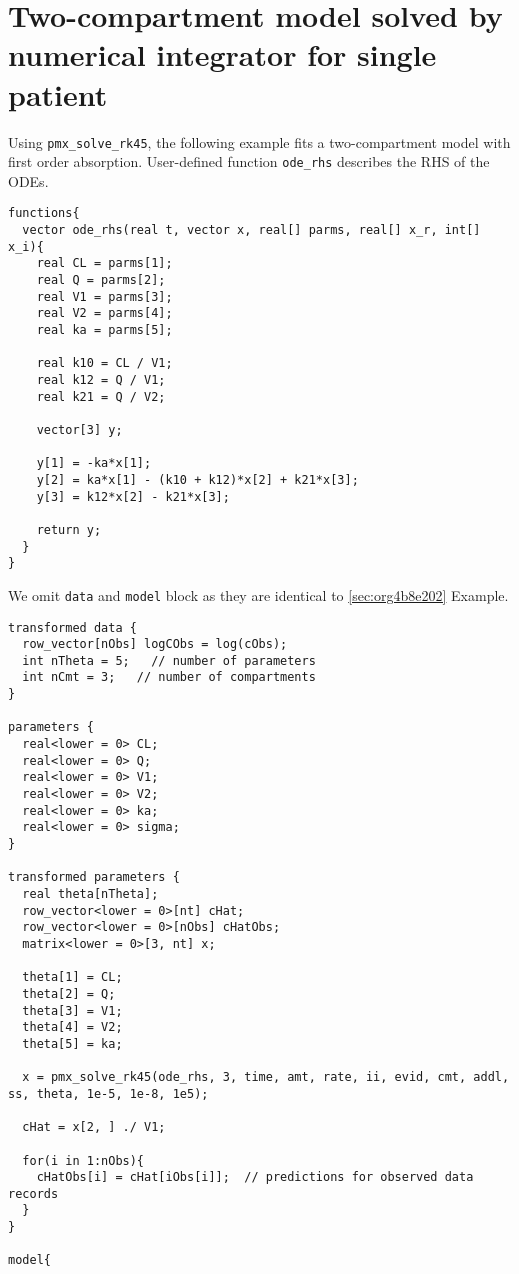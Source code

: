 \documentclass[12pt, reqno, oneside]{amsbook}
\numberwithin{equation}{chapter}
\numberwithin{figure}{chapter}
\numberwithin{table}{chapter}
\theoremstyle{remark}
\begin{document}
\section{Two-compartment model solved by numerical integrator for single patient}
\label{sec:org1ae9370}
Using \texttt{pmx\_solve\_rk45}, the following example fits a two-compartment model
with first order absorption. User-defined function
\texttt{ode\_rhs} describes the RHS of the ODEs.
\begin{verbatim}
functions{
  vector ode_rhs(real t, vector x, real[] parms, real[] x_r, int[] x_i){
    real CL = parms[1];
    real Q = parms[2];
    real V1 = parms[3];
    real V2 = parms[4];
    real ka = parms[5];

    real k10 = CL / V1;
    real k12 = Q / V1;
    real k21 = Q / V2;

    vector[3] y;

    y[1] = -ka*x[1];
    y[2] = ka*x[1] - (k10 + k12)*x[2] + k21*x[3];
    y[3] = k12*x[2] - k21*x[3];

    return y;
  }
}
\end{verbatim}

We omit \texttt{data} and
\texttt{model} block as they are identical to \ref{sec:org4b8e202} Example.

\begin{verbatim}
transformed data {
  row_vector[nObs] logCObs = log(cObs);
  int nTheta = 5;   // number of parameters
  int nCmt = 3;   // number of compartments
}

parameters {
  real<lower = 0> CL;
  real<lower = 0> Q;
  real<lower = 0> V1;
  real<lower = 0> V2;
  real<lower = 0> ka;
  real<lower = 0> sigma;
}

transformed parameters {
  real theta[nTheta];
  row_vector<lower = 0>[nt] cHat;
  row_vector<lower = 0>[nObs] cHatObs;
  matrix<lower = 0>[3, nt] x;

  theta[1] = CL;
  theta[2] = Q;
  theta[3] = V1;
  theta[4] = V2;
  theta[5] = ka;

  x = pmx_solve_rk45(ode_rhs, 3, time, amt, rate, ii, evid, cmt, addl, ss, theta, 1e-5, 1e-8, 1e5);

  cHat = x[2, ] ./ V1;

  for(i in 1:nObs){
    cHatObs[i] = cHat[iObs[i]];  // predictions for observed data records
  }
}

model{
\end{verbatim}
\end{document}
